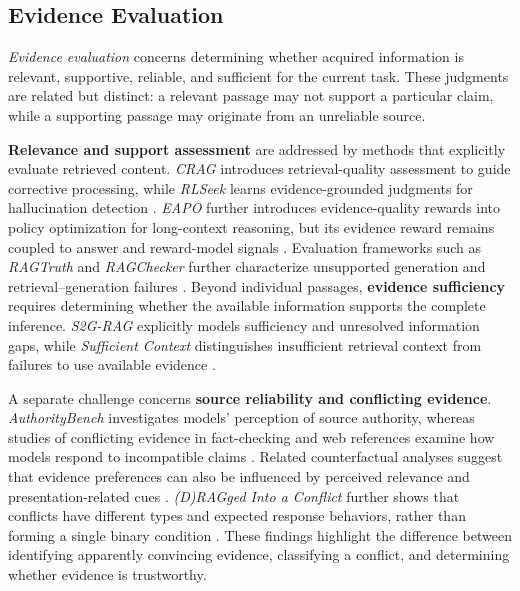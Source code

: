 \subsection{Evidence Evaluation}
\label{sec:evidence_evaluation}

\textit{Evidence evaluation} concerns determining whether acquired information is relevant, supportive, reliable, and sufficient for the current task. These judgments are related but distinct: a relevant passage may not support a particular claim, while a supporting passage may originate from an unreliable source.

\textbf{Relevance and support assessment} are addressed by methods that explicitly evaluate retrieved content. \textit{CRAG} introduces retrieval-quality assessment to guide corrective processing, while \textit{RLSeek} learns evidence-grounded judgments for hallucination detection \cite{crag,rlseek}. \textit{EAPO} further introduces evidence-quality rewards into policy optimization for long-context reasoning, but its evidence reward remains coupled to answer and reward-model signals \cite{eapo}. Evaluation frameworks such as \textit{RAGTruth} and \textit{RAGChecker} further characterize unsupported generation and retrieval--generation failures \cite{ragtruth,ragchecker}. Beyond individual passages, \textbf{evidence sufficiency} requires determining whether the available information supports the complete inference. \textit{S2G-RAG} explicitly models sufficiency and unresolved information gaps, while \textit{Sufficient Context} distinguishes insufficient retrieval context from failures to use available evidence \cite{s2g_rag,sufficient_context}.

A separate challenge concerns \textbf{source reliability and conflicting evidence}. \textit{AuthorityBench} investigates models' perception of source authority, whereas studies of conflicting evidence in fact-checking and web references examine how models respond to incompatible claims \cite{authoritybench,confact,conflicting_web_references}. Related counterfactual analyses suggest that evidence preferences can also be influenced by perceived relevance and presentation-related cues \cite{what_evidence_convincing}. \textit{(D)RAGged Into a Conflict} further shows that conflicts have different types and expected response behaviors, rather than forming a single binary condition \cite{dragged_into_conflict}. These findings highlight the difference between identifying apparently convincing evidence, classifying a conflict, and determining whether evidence is trustworthy.

